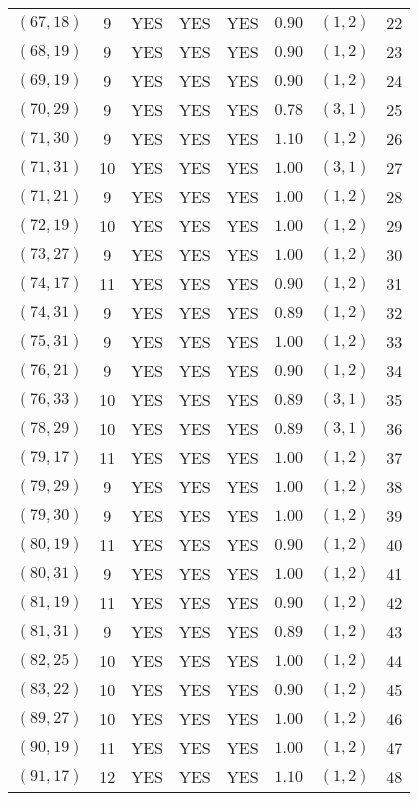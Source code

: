 \begin{longtable}{|c|c|c|c|c|c|c|c|}
$(67,18)$ & 9 & YES & YES & YES & $0.90$ & $(1,2)$ & 22\\
$(68,19)$ & 9 & YES & YES & YES & $0.90$ & $(1,2)$ & 23\\
$(69,19)$ & 9 & YES & YES & YES & $0.90$ & $(1,2)$ & 24\\
$(70,29)$ & 9 & YES & YES & YES & $0.78$ & $(3,1)$ & 25\\
$(71,30)$ & 9 & YES & YES & YES & $1.10$ & $(1,2)$ & 26\\
$(71,31)$ & 10 & YES & YES & YES & $1.00$ & $(3,1)$ & 27\\
$(71,21)$ & 9 & YES & YES & YES & $1.00$ & $(1,2)$ & 28\\
$(72,19)$ & 10 & YES & YES & YES & $1.00$ & $(1,2)$ & 29\\
$(73,27)$ & 9 & YES & YES & YES & $1.00$ & $(1,2)$ & 30\\
$(74,17)$ & 11 & YES & YES & YES & $0.90$ & $(1,2)$ & 31\\
$(74,31)$ & 9 & YES & YES & YES & $0.89$ & $(1,2)$ & 32\\
$(75,31)$ & 9 & YES & YES & YES & $1.00$ & $(1,2)$ & 33\\
$(76,21)$ & 9 & YES & YES & YES & $0.90$ & $(1,2)$ & 34\\
$(76,33)$ & 10 & YES & YES & YES & $0.89$ & $(3,1)$ & 35\\
$(78,29)$ & 10 & YES & YES & YES & $0.89$ & $(3,1)$ & 36\\
$(79,17)$ & 11 & YES & YES & YES & $1.00$ & $(1,2)$ & 37\\
$(79,29)$ & 9 & YES & YES & YES & $1.00$ & $(1,2)$ & 38\\
$(79,30)$ & 9 & YES & YES & YES & $1.00$ & $(1,2)$ & 39\\
$(80,19)$ & 11 & YES & YES & YES & $0.90$ & $(1,2)$ & 40\\
$(80,31)$ & 9 & YES & YES & YES & $1.00$ & $(1,2)$ & 41\\
$(81,19)$ & 11 & YES & YES & YES & $0.90$ & $(1,2)$ & 42\\
$(81,31)$ & 9 & YES & YES & YES & $0.89$ & $(1,2)$ & 43\\
$(82,25)$ & 10 & YES & YES & YES & $1.00$ & $(1,2)$ & 44\\
$(83,22)$ & 10 & YES & YES & YES & $0.90$ & $(1,2)$ & 45\\
$(89,27)$ & 10 & YES & YES & YES & $1.00$ & $(1,2)$ & 46\\
$(90,19)$ & 11 & YES & YES & YES & $1.00$ & $(1,2)$ & 47\\
$(91,17)$ & 12 & YES & YES & YES & $1.10$ & $(1,2)$ & 48\\

\end{longtable}
